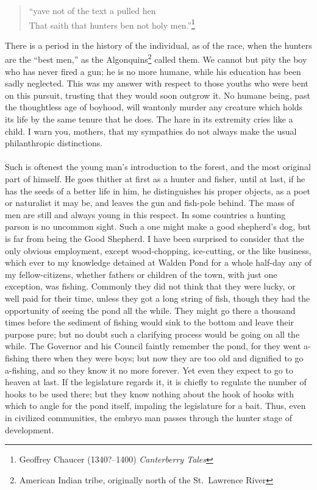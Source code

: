 \documentclass[letterpaper,12pt]{article}
\begin{document}
\begin{verse}
    \enquote{yave not of the text a pulled hen \\
        That saith that hunters ben not holy men.}\footnote{Geoffrey Chaucer (1340?--1400) \textit{Canterberry Tales}}
\end{verse}

There is a period in the history of the individual, as of the race, when the
hunters are the \enquote{best men,} as the Algonquins\footnote{American Indian
    tribe, originally north of the St.\ Lawrence River} called them. We cannot
but pity the boy who has never fired a gun; he is no more humane, while his
education has been sadly neglected. This was my answer with respect to those
youths who were bent on this pursuit, trusting that they would soon outgrow it.
No humane being, past the thoughtless age of boyhood, will wantonly murder any
creature which holds its life by the same tenure that he does. The hare in its
extremity cries like a child. I warn you, mothers, that my sympathies do not
always make the usual philanthropic distinctions.

\paragraph{} Such is oftenest the young man's introduction to the forest, and
the most original part of himself. He goes thither at first as a hunter and
fisher, until at last, if he has the seeds of a better life in him, he
distinguishes his proper objects, as a poet or naturalist it may be, and leaves
the gun and fish-pole behind. The mass of men are still and always young in this
respect. In some countries a hunting parson is no uncommon sight. Such a one
might make a good shepherd's dog, but is far from being the Good Shepherd. I
have been surprised to consider that the only obvious employment, except
wood-chopping, ice-cutting, or the like business, which ever to my knowledge
detained at Walden Pond for a whole half-day any of my fellow-citizens, whether
fathers or children of the town, with just one exception, was fishing. Commonly
they did not think that they were lucky, or well paid for their time, unless
they got a long string of fish, though they had the opportunity of seeing the
pond all the while. They might go there a thousand times before the sediment of
fishing would sink to the bottom and leave their purpose pure; but no doubt such
a clarifying process would be going on all the while. The Governor and his
Council faintly remember the pond, for they went a-fishing there when they were
boys; but now they are too old and dignified to go a-fishing, and so they know
it no more forever. Yet even they expect to go to heaven at last. If the
legislature regards it, it is chiefly to regulate the number of hooks to be used
there; but they know nothing about the hook of hooks with which to angle for the
pond itself, impaling the legislature for a bait. Thus, even in civilized
communities, the embryo man passes through the hunter stage of development.
\end{document}

